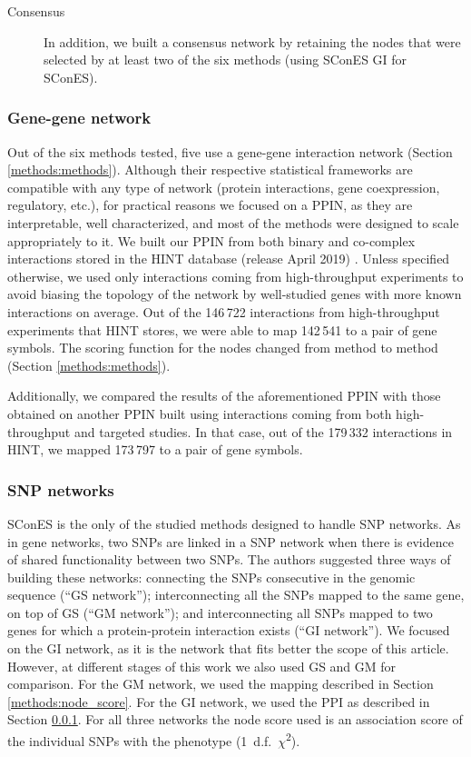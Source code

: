 \documentclass[twocolumn, 11pt, draft]{article}
\begin{document}
\begin{description}
\item[{Consensus}] In addition, we built a consensus network by retaining the nodes that were selected by at least two of the six methods (using SConES GI for SConES).
\end{description}

\subsubsection{Gene-gene network}
\label{methods:gene_network}
Out of the six methods tested, five use a gene-gene interaction network (Section \ref{methods:methods}). Although their respective statistical frameworks are compatible with any type of network (protein interactions, gene coexpression, regulatory, etc.), for practical reasons we focused on a PPIN, as they are interpretable, well characterized, and most of the methods were designed to scale appropriately to it. We built our PPIN from both binary and co-complex interactions stored in the HINT database (release April 2019) \cite{das_hint:_2012}. Unless specified otherwise, we used only interactions coming from high-throughput experiments to avoid biasing the topology of the network by well-studied genes with more known interactions on average. Out of the 146\,722 interactions from high-throughput experiments that HINT stores, we were able to map 142\,541 to a pair of gene symbols. The scoring function for the nodes changed from method to method (Section \ref{methods:methods}).

Additionally, we compared the results of the aforementioned PPIN with those obtained on another PPIN built using interactions coming from both high-throughput and targeted studies. In that case, out of the 179\,332 interactions in HINT, we mapped 173\,797 to a pair of gene symbols. 

\subsubsection{SNP networks}
\label{methods:snp_network}
SConES \cite{azencott_efficient_2013} is the only of the studied methods designed to handle SNP networks. As in gene networks, two SNPs are linked in a SNP network when there is evidence of shared functionality between two SNPs. The authors suggested three ways of building these networks: connecting the SNPs consecutive in the genomic sequence (``GS network''); interconnecting all the SNPs mapped to the same gene, on top of GS (``GM network''); and interconnecting all SNPs mapped to two genes for which a protein-protein interaction exists (``GI network''). We focused on the GI network, as it is the network that fits better the scope of this article. However, at different stages of this work we also used GS and GM for comparison. For the GM network, we used the mapping described in Section \ref{methods:node_score}. For the GI network, we used the PPI as described in Section \ref{methods:gene_network}. For all three networks the node score used is an association score of the individual SNPs with the phenotype (1~d.f.~\(\chi\)\textsuperscript{2}).
\end{document}

